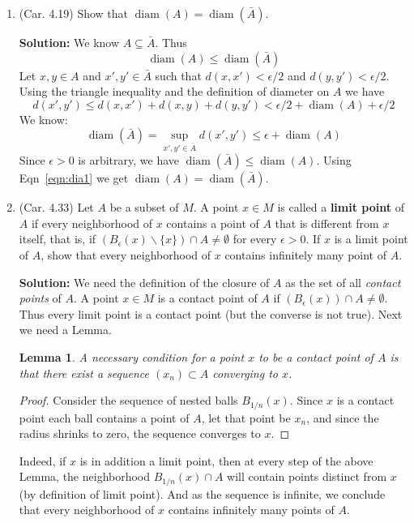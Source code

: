 \documentclass{article}
\newtheorem{lem}{Lemma}
\def\le{\leqslant}
\def\diam{\operatorname{diam}}
\begin{document}
\begin{enumerate}

\item (Car. 4.19) Show that $\diam \left (A \right ) = \diam \left (\bar{A} \right )$.

\textbf{Solution:} 
We know $A \subseteq \bar{A}$. Thus 
\begin{equation}
\diam \left (A \right ) \le \diam \left(\bar{A}\right ) \label{eqn:dia1}
\end{equation}
Let $x,y \in A$ and $x',y' \in \bar{A}$ such that $d(x,x') < \epsilon/2$
and $d(y,y') < \epsilon/2$. Using the triangle inequality and the definition
of diameter on $A$ we have
\[
d(x',y') \le d(x,x') + d(x,y) + d(y,y') < \epsilon/2 + \diam \left(A\right) + \epsilon/2
\]
We know:
\[
\diam\left(\bar{A}\right) = \sup_{x',y' \in \bar{A}} d(x',y') 
                          \le \epsilon + \diam\left(A\right)
\]
Since $\epsilon > 0$ is arbitrary, we have $\diam\left({\bar{A}}\right) 
\le \diam\left(A\right)$.
Using Eqn~\ref{eqn:dia1} we get $\diam\left(A\right) = \diam\left({\bar{A}}\right)$.


\item (Car. 4.33) Let $A$ be a subset of $M$. A point $x \in M$ is called a \textbf{limit point} of $A$ if every neighborhood of $x$ contains a point of $A$ that is different from $x$ itself, that is, if $(B_{\epsilon}(x) \backslash \{ x \} ) \cap A \neq \emptyset$ for every $\epsilon > 0$. If $x$ is a limit point of $A$, show that every neighborhood of $x$ contains infinitely many point of $A$.

\textbf{Solution:} We need the definition of the closure of $A$ as the set of all \emph{contact points} of $A$.
A point $x \in M$ is a  contact point of $A$ if $(B_{\epsilon}(x)) \cap A \neq \emptyset$. Thus every limit point is a contact
point (but the converse is not true). Next we need a Lemma.
\begin{lem} A necessary condition for a point $x$ to be a contact point of $A$ is that there exist a
sequence $(x_n) \subset A $ converging to $x$.
\end{lem}
\begin{proof}
Consider the sequence of nested balls $B_{1/n}(x)$. Since $x$ is a contact point each ball contains a point of $A$, 
let that point be $x_n$, and since the radius shrinks to zero, the sequence converges to $x$.
\end{proof}
Indeed, if $x$ is in addition a limit point, then at every step of the above Lemma, the neighborhood $B_{1/n}(x) \cap A$
will contain points distinct from $x$ (by definition of limit point). And as the sequence is infinite, we conclude
that every neighborhood of $x$ contains infinitely many points of $A$.


\end{enumerate}
\end{document}
